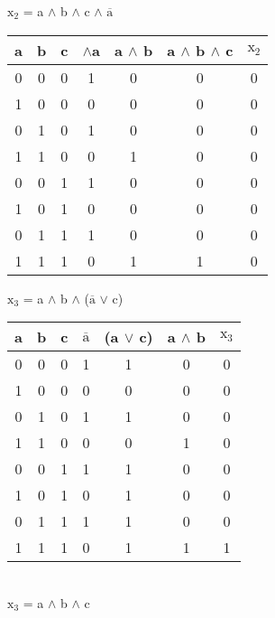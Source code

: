 $\text{x}_2$ = a $\land$ b $\land$ c $\land$ $\overline{\text{a}}$ \\

\begin{tabular}{c|c|c|c||c||c||c}
	a & b & c & $\land$a & a $\land$ b & a $\land$ b $\land$ c & $\text{x}_2$ \\
	\hline
	0 & 0 & 0 & 1 & 0 & 0 & 0 \\
	1 & 0 & 0 & 0 & 0 & 0 & 0 \\
	0 & 1 & 0 & 1 & 0 & 0 & 0 \\
	1 & 1 & 0 & 0 & 1 & 0 & 0 \\
	0 & 0 & 1 & 1 & 0 & 0 & 0 \\
	1 & 0 & 1 & 0 & 0 & 0 & 0 \\
	0 & 1 & 1 & 1 & 0 & 0 & 0 \\
	1 & 1 & 1 & 0 & 1 & 1 & 0 \\
\end{tabular}

$\text{x}_3$ = a $\land$ b $\land$ ($\overline{\text{a}}$ $\lor$ c) \\

\begin{tabular}{c|c|c|c||c||c||c}
	a & b & c & $\overline{\text{a}}$ & (a $\lor$ c) & a $\land$ b & $\text{x}_3$ \\
	\hline
	0 & 0 & 0 & 1 & 1 & 0 & 0 \\
	1 & 0 & 0 & 0 & 0 & 0 & 0 \\
	0 & 1 & 0 & 1 & 1 & 0 & 0 \\
	1 & 1 & 0 & 0 & 0 & 1 & 0 \\
	0 & 0 & 1 & 1 & 1 & 0 & 0 \\
	1 & 0 & 1 & 0 & 1 & 0 & 0 \\
	0 & 1 & 1 & 1 & 1 & 0 & 0 \\
	1 & 1 & 1 & 0 & 1 & 1 & 1 \\
\end{tabular} \\
$\text{x}_3$ = a $\land$ b $\land$ c 

